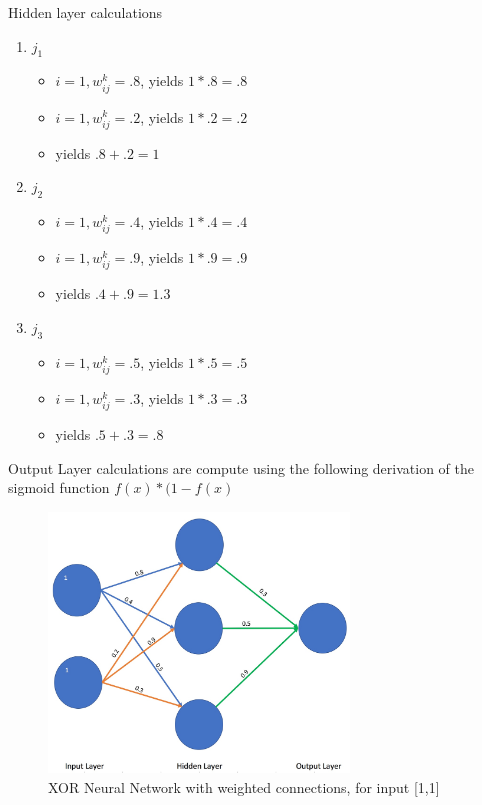 \documentclass[journal]{IEEEtran}
\begin{document}
Hidden layer calculations
\begin{enumerate}
    \item $j_1$ 
    \begin{itemize}
        \item $i = 1, w_{ij}^k = .8$, yields $1 * .8 = .8$
        \item $i = 1, w_{ij}^k = .2$, yields $1 * .2 = .2$
        \item yields $.8 + .2 = 1$
    \end{itemize}
    \item $j_2$ 
    \begin{itemize}
        \item $i = 1, w_{ij}^k = .4$, yields $1 * .4 = .4$
        \item $i = 1, w_{ij}^k = .9$, yields $1 * .9 = .9$
        \item yields $.4 + .9 = 1.3$
    \end{itemize}
    \item $j_3$ 
    \begin{itemize}
        \item $i = 1, w_{ij}^k = .5$, yields $1 * .5 = .5$
        \item $i = 1, w_{ij}^k = .3$, yields $1 * .3 = .3$
        \item yields $.5 + .3 = .8$
    \end{itemize}
\end{enumerate}

Output Layer calculations are compute using the following derivation of the sigmoid function $f(x) * (1 - f(x)$

\begin{figure}[h]
    \centering
    \includegraphics[width=8cm]{xor}
    \caption{XOR Neural Network with weighted connections, for input [1,1]}
\end{figure}
\end{document}
